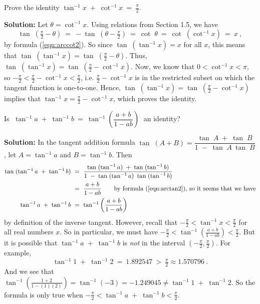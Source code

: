 \begin{exmp}
 Prove the identity $\tan^{-1} x \;+\; \cot^{-1} x ~=~ \frac{\pi}{2}$.\vspace{1mm}
 \par\noindent\textbf{Solution:} Let $\theta = \cot^{-1} x$. Using relations from Section 1.5, we have
 \begin{displaymath}
  \tan\;\left( \tfrac{\pi}{2} - \theta \right) ~=~ -\tan\;\left( \theta - \tfrac{\pi}{2} \right)
   ~=~ \cot\;\theta ~=~ \cot\;(\cot^{-1} x) ~=~ x ~,
 \end{displaymath}
 by formula (\ref{eqn:arccot2}). So since $\tan\;(\tan^{-1} x) = x$ for all $x$, this means that
 $\tan\;(\tan^{-1} x) = \tan\;\left( \tfrac{\pi}{2} - \theta \right)$. Thus,
 $\tan\;(\tan^{-1} x) = \tan\;\left( \tfrac{\pi}{2} - \cot^{-1} x \right)$. Now, we know that
 $0 < \cot^{-1} x < \pi$, so $-\tfrac{\pi}{2} < \tfrac{\pi}{2} - \cot^{-1} x < \tfrac{\pi}{2}$, i.e.
 $\tfrac{\pi}{2} - \cot^{-1} x$ is in the restricted subset on which the tangent function is
 one-to-one. Hence, $\tan\;(\tan^{-1} x) = \tan\;\left( \tfrac{\pi}{2} - \cot^{-1} x \right)$
 implies that $\tan^{-1} x = \tfrac{\pi}{2} - \cot^{-1} x$, which proves the identity.
\end{exmp}
\begin{exmp}\label{exmp:arctanab}
 Is $\;\tan^{-1} a \;+\; \tan^{-1} b ~=~ \tan^{-1} \left( \dfrac{a+b}{1-ab} \right)\;$ an
 identity?\vspace{1mm}
 \par\noindent\textbf{Solution:} In the tangent addition formula $\tan\;(A+B) = \dfrac{\tan\;A \;+\;
 \tan\;B}{1 \;-\; \tan\;A~\tan\;B}$, let $A = \tan^{-1} a$ and $B = \tan^{-1} b$. Then
 \begin{align*}
  \tan\;(\tan^{-1} a \;+\; \tan^{-1} b ) ~&=~ \dfrac{\tan\;(\tan^{-1} a) \;+\; \tan\;(\tan^{-1}
   b)}{1 \;-\; \tan\;(\tan^{-1} a)~\tan\;(\tan^{-1} b)}\\
  &=~ \dfrac{a+b}{1-ab}\qquad\text{by formula (\ref{eqn:arctan2}), so it seems that we have}\\
  \tan^{-1} a \;+\; \tan^{-1} b ~&=~ \tan^{-1} \left( \dfrac{a+b}{1-ab} \right)
 \end{align*}
 by definition of the inverse tangent. However, recall that
 $-\tfrac{\pi}{2} < \tan^{-1} x < \tfrac{\pi}{2}$ for all real numbers $x$. So in particular,
 we must have $-\tfrac{\pi}{2} < \tan^{-1} \left( \frac{a+b}{1-ab} \right) < \tfrac{\pi}{2}$. But
 it is possible that $\tan^{-1} a \;+\; \tan^{-1} b$ is \emph{not} in the interval
 $\left(-\tfrac{\pi}{2},\tfrac{\pi}{2}\right)$. For example,
 \begin{displaymath}
  \tan^{-1} 1 \;+\; \tan^{-1} 2 ~=~ 1.892547 ~>~ \tfrac{\pi}{2} \approx 1.570796 ~.
 \end{displaymath}
 And we see that $\tan^{-1} \left( \frac{1+2}{1-(1)(2)} \right) = \tan^{-1} (-3) = -1.249045 \ne
 \tan^{-1} 1 \;+\; \tan^{-1} 2$. So the formula is only true when
 $-\tfrac{\pi}{2} < \tan^{-1} a \;+\; \tan^{-1} b < \tfrac{\pi}{2}$.
\end{exmp}
